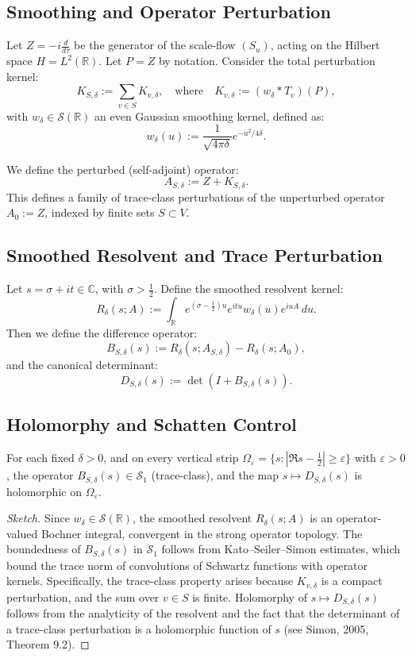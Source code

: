 \subsection{Smoothing and Operator Perturbation}

Let \( Z = -i \frac{d}{d\tau} \) be the generator of the scale-flow \( (S_u) \), acting on the Hilbert space \( H = L^2(\mathbb{R}) \). Let \( P = Z \) by notation. Consider the total perturbation kernel:
\[
K_{S,\delta} := \sum_{v \in S} K_{v,\delta}, \quad \text{where} \quad K_{v,\delta} := \left( w_\delta * T_v \right)(P),
\]
with \( w_\delta \in \mathcal{S}(\mathbb{R}) \) an even Gaussian smoothing kernel, defined as:
\[
w_\delta(u) := \frac{1}{\sqrt{4\pi \delta}} e^{-u^2 / 4\delta}.
\]

We define the perturbed (self-adjoint) operator:
\[
A_{S,\delta} := Z + K_{S,\delta}.
\]
This defines a family of trace-class perturbations of the unperturbed operator \( A_0 := Z \), indexed by finite sets \( S \subset V \).

\subsection{Smoothed Resolvent and Trace Perturbation}

Let \( s = \sigma + it \in \mathbb{C} \), with \( \sigma > \frac{1}{2} \). Define the smoothed resolvent kernel:
\[
R_\delta(s; A) := \int_{\mathbb{R}} e^{(\sigma - \frac{1}{2})u} e^{itu} w_\delta(u) e^{iuA} \, du.
\]
Then we define the difference operator:
\[
B_{S,\delta}(s) := R_\delta(s; A_{S,\delta}) - R_\delta(s; A_0),
\]
and the canonical determinant:
\[
D_{S,\delta}(s) := \det \left( I + B_{S,\delta}(s) \right).
\]

\subsection{Holomorphy and Schatten Control}

\begin{proposition}
For each fixed \( \delta > 0 \), and on every vertical strip \( \Omega_\varepsilon = \{ s : |\Re s - \frac{1}{2}| \geq \varepsilon \} \) with \( \varepsilon > 0 \), the operator \( B_{S,\delta}(s) \in \mathcal{S}_1 \) (trace-class), and the map \( s \mapsto D_{S,\delta}(s) \) is holomorphic on \( \Omega_\varepsilon \).
\end{proposition}

\begin{proof}[Sketch]
Since \( w_\delta \in \mathcal{S}(\mathbb{R}) \), the smoothed resolvent \( R_\delta(s; A) \) is an operator-valued Bochner integral, convergent in the strong operator topology. The boundedness of \( B_{S,\delta}(s) \) in \( \mathcal{S}_1 \) follows from Kato–Seiler–Simon estimates, which bound the trace norm of convolutions of Schwartz functions with operator kernels. Specifically, the trace-class property arises because \( K_{v,\delta} \) is a compact perturbation, and the sum over \( v \in S \) is finite. Holomorphy of \( s \mapsto D_{S,\delta}(s) \) follows from the analyticity of the resolvent and the fact that the determinant of a trace-class perturbation is a holomorphic function of \( s \) (see Simon, 2005, Theorem 9.2).
\end{proof}

